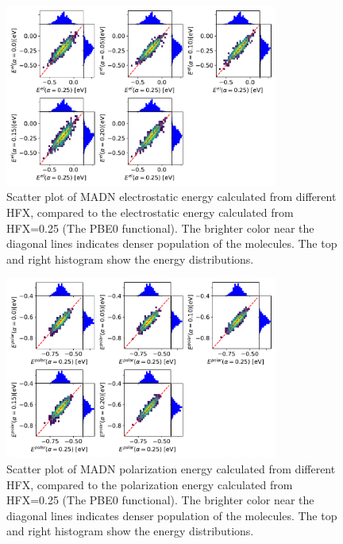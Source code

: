 \documentclass[%
 reprint,
superscriptaddress,
 amsmath,amssymb,
 aps,
prb,
floatfix
]{revtex4-2}
\begin{document}
\begin{figure}
  \centering
  \includegraphics[width=0.80\textwidth]{figs/scatterEstat_qmmm.pdf}
  \caption{Scatter plot of MADN electrostatic energy calculated from different HFX, compared to the electrostatic energy calculated from HFX=0.25 (The PBE0 functional). The brighter color near the diagonal lines indicates denser population of the molecules.  The top and right histogram show the energy distributions.}
  \label{fig:Estat_qmmm_MADN}
\end{figure}

\begin{figure}
  \centering
  \includegraphics[width=0.80\textwidth]{figs/scatterEdip_qmmm.pdf}
  \caption{Scatter plot of MADN polarization energy calculated from different HFX, compared to the polarization energy calculated from HFX=0.25 (The PBE0 functional). The brighter color near the diagonal lines indicates denser population of the molecules.  The top and right histogram show the energy distributions.}
  \label{fig:Edip_qmmm_MADN}
\end{figure}
\end{document}
